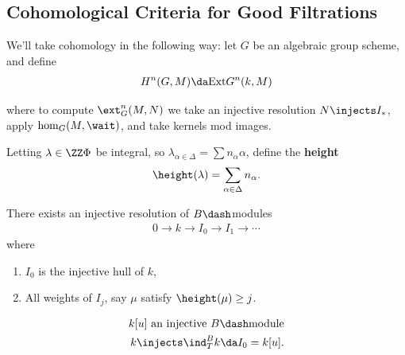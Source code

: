 \begin{center}\end{center}

\hypertarget{cohomological-criteria-for-good-filtrations}{%
\subsection{Cohomological Criteria for Good
Filtrations}\label{cohomological-criteria-for-good-filtrations}}

We'll take cohomology in the following way: let \(G\) be an algebraic
group scheme, and define
\begin{align*}  
H^n(G, M) \da 
\mathrm{Ext} G^n(k, M)
\end{align*}

where to compute \(\ext_G^n(M, N)\) we take an injective resolution
\(N \injects I_*\), apply \(\hom_G(M, \wait)\), and take kernels mod
images.

Letting \(\lambda \in \ZZ\Phi\) be integral, so
\(\lambda_{\alpha \in \Delta} = \sum n_\alpha \alpha\), define the
\textbf{height}
\begin{align*}  
\height(\lambda) = \sum_{\alpha\in\Delta} n_\alpha
.\end{align*}

\begin{lemma}[?]

There exists an injective resolution of \(B\dash\)modules
\begin{align*}  
0\to k\to I_0 \to I_1 \to \cdots
\end{align*} where

\begin{enumerate}
\def\labelenumi{\arabic{enumi}.}
\tightlist
\item
  \(I_0\) is the injective hull of \(k\),
\item
  All weights of \(I_j\), say \(\mu\) satisfy \(\height(\mu) \geq j\).
\end{enumerate}

\end{lemma}

\begin{align*}  
k[u] \text{ an injective $B\dash$module} \\
k\injects \ind_T^B k \da I_0 = k[u]
.\end{align*}

